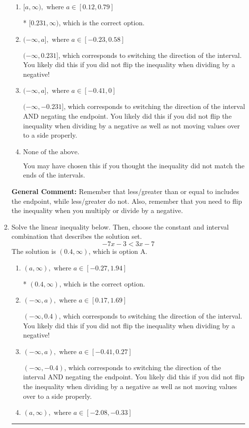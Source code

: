 \documentclass{extbook}[14pt]
\newcommand{\litem}[1]{\item #1

\rule{\textwidth}{0.4pt}}
\begin{document}
\begin{enumerate}
{\begin{enumerate}[label=\Alph*.]
 $[-0.231, \infty)$, which corresponds to negating the endpoint of the solution.
\item \( [a, \infty), \text{ where } a \in [0.12, 0.79] \)

* $[0.231, \infty)$, which is the correct option.
\item \( (-\infty, a], \text{ where } a \in [-0.23, 0.58] \)

 $(-\infty, 0.231]$, which corresponds to switching the direction of the interval. You likely did this if you did not flip the inequality when dividing by a negative!
\item \( (-\infty, a], \text{ where } a \in [-0.41, 0] \)

 $(-\infty, -0.231]$, which corresponds to switching the direction of the interval AND negating the endpoint. You likely did this if you did not flip the inequality when dividing by a negative as well as not moving values over to a side properly.
\item \( \text{None of the above}. \)

You may have chosen this if you thought the inequality did not match the ends of the intervals.
\end{enumerate}

\textbf{General Comment:} Remember that less/greater than or equal to includes the endpoint, while less/greater do not. Also, remember that you need to flip the inequality when you multiply or divide by a negative.
}
\litem{
Solve the linear inequality below. Then, choose the constant and interval combination that describes the solution set.
\[ -7x -3 < 3x -7 \]The solution is \( (0.4, \infty) \), which is option A.\begin{enumerate}[label=\Alph*.]
\item \( (a, \infty), \text{ where } a \in [-0.27, 1.94] \)

* $(0.4, \infty)$, which is the correct option.
\item \( (-\infty, a), \text{ where } a \in [0.17, 1.69] \)

 $(-\infty, 0.4)$, which corresponds to switching the direction of the interval. You likely did this if you did not flip the inequality when dividing by a negative!
\item \( (-\infty, a), \text{ where } a \in [-0.41, 0.27] \)

 $(-\infty, -0.4)$, which corresponds to switching the direction of the interval AND negating the endpoint. You likely did this if you did not flip the inequality when dividing by a negative as well as not moving values over to a side properly.
\item \( (a, \infty), \text{ where } a \in [-2.08, -0.33] \)


\end{enumerate}}
\end{enumerate}
\end{document}
